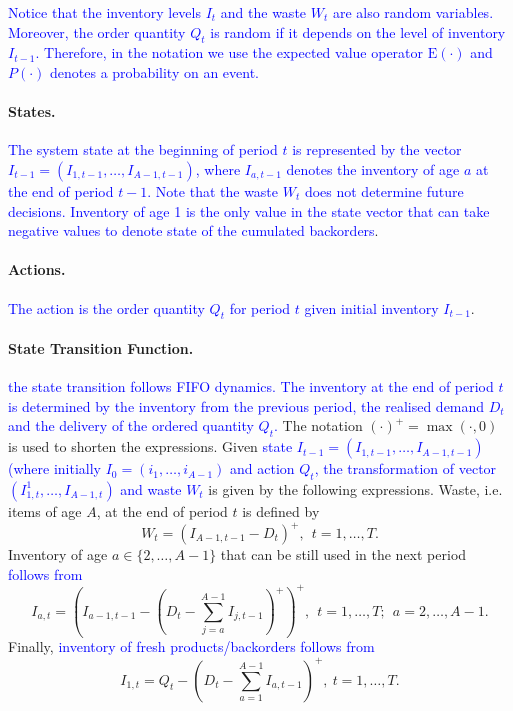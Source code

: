 \documentclass{tPRS2e}
\newcommand{\blue}{\textcolor{blue}}
\begin{document}
\blue{Notice that the inventory levels $I_t$ and the waste $W_t$ are also random variables. Moreover, the order quantity $Q_t$ is random if it depends on the level of inventory $I_{t-1}$. Therefore, in the notation we use the expected value operator $\mathrm E(\cdot)$ and $P(\cdot)$ denotes a probability on an event.} 	
	\paragraph*{\bf States.}
\blue{The system state at the beginning of period $t$ is represented by the vector $I_{t-1}=(I_{1,t-1},\ldots,I_{A-1,t-1})$, where $I_{a,t-1}$ denotes the inventory of age $a$ at the end of period $t-1$. Note that the waste $W_t$ does not determine future decisions. Inventory of age 1 is the only value in the state vector that can take negative values to denote state of the cumulated backorders}. 
	
	
	\paragraph*{\bf Actions.}
\blue{The action is the order quantity $Q_t$ for period $t$ given initial inventory $I_{t-1}$}.
	
	\paragraph*{\bf State Transition Function.}
\blue{the state transition follows FIFO dynamics. The inventory at the end of period $t$ is determined by the inventory from the previous period, the realised demand $D_t$ and the delivery of the ordered quantity $Q_t$.} The notation $(\cdot)^+ = \max(\cdot,0)$ is used to shorten the expressions. Given \blue{state $I_{t-1}=(I_{1,t-1},\ldots,I_{A-1,t-1})$ (where initially $I_0=(i_1,\ldots,i_{A-1})$ and action $Q_t$, the transformation of vector $(I_{1,t}^1,\ldots,I_{A-1,t})$ and waste $W_t$} is given by the following expressions. Waste, i.e. items of age $A$, at the end of period $t$ is defined by
%	
	\begin{equation}
		\label{eq:invWaste}
		W_t=(I_{A-1,t-1} - D_t)^+, ~~t=1,\ldots,T.
	\end{equation}
	Inventory of age $a\in\{2,\ldots,A-1\}$ that can be still used in the next period \blue{follows from}
	\begin{equation}
		\label{eq:inv2}
		I_{a,t}= \left(I_{a-1,t-1} - (D_t-\sum_{j=a}^{A-1} I_{j,t-1})^+\right)^+, ~~t=1,\ldots,T; ~~ a=2,\ldots,A-1.
	\end{equation}
	Finally,  \blue{inventory of fresh products/backorders follows from}
	\begin{equation}
		\label{eq:inv1}
		I_{1,t}= Q_t - (D_t-\sum_{a=1}^{A-1}I_{a,t-1})^+, \ t=1,\ldots,T.
	\end{equation}
	
\end{document}
